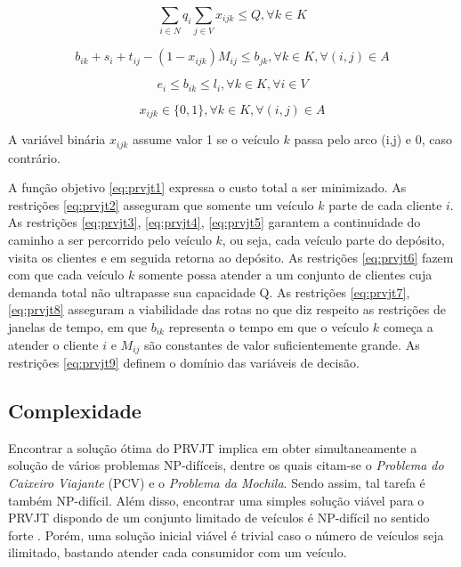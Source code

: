 \begin{equation} \label{eq:prvjt6}
\sum_{i \in N} q_i \sum_{j \in V} x_{ijk} \leq Q, \forall k \in K
\end{equation}

\begin{equation} \label{eq:prvjt7}
b_{ik} + s_i + t_{ij} -(1-x_{ijk})M_{ij} \leq b_{jk},\forall k \in K, \forall (i,j) \in A
\end{equation}

\begin{equation} \label{eq:prvjt8}
e_i \leq b_{ik} \leq l_i,\forall k \in K,\forall i \in V
\end{equation}

\begin{equation} \label{eq:prvjt9}
x_{ijk} \in \{0,1\},\forall k \in K,\forall (i,j) \in A
\end{equation}

A variável binária \(x_{ijk}\) assume valor 1 se o veículo \(k\) passa pelo arco (i,j) e 0, caso contrário.

A função objetivo \ref{eq:prvjt1} expressa o custo total a ser minimizado. 
As restrições \ref{eq:prvjt2} asseguram que somente um veículo \(k\) parte de cada cliente \(i\). 
As restrições \ref{eq:prvjt3}, \ref{eq:prvjt4}, \ref{eq:prvjt5} garantem a continuidade do caminho a ser percorrido pelo veículo \(k\), ou seja, cada veículo parte do depósito, visita os clientes e em seguida retorna ao depósito. 
As restrições \ref{eq:prvjt6} fazem com que cada veículo \(k\) somente possa atender a um conjunto de clientes cuja demanda total não ultrapasse sua capacidade Q. 
As restrições \ref{eq:prvjt7}, \ref{eq:prvjt8} asseguram a viabilidade das rotas no que diz respeito as restrições de janelas de tempo, em que \(b_{ik}\) representa o tempo em que o veículo \(k\) começa a atender o cliente \(i\) e \(M_{ij}\) são constantes de valor suficientemente grande.  As restrições \ref{eq:prvjt9} definem o domínio das variáveis de decisão.~\cite{CORDEAU}


\subsection{Complexidade}

Encontrar a solução ótima do PRVJT implica em obter simultaneamente a solução de vários problemas NP-difíceis, dentre os quais citam-se o \textit{Problema do Caixeiro Viajante} (PCV) e o \textit{Problema da Mochila}. Sendo assim, tal tarefa é também NP-difícil. Além disso, encontrar uma simples solução viável para o PRVJT dispondo de um conjunto limitado de veículos é NP-difícil no sentido forte \cite{Kohl}. Porém, uma solução inicial viável é trivial caso o número de veículos seja ilimitado, bastando atender cada consumidor com um veículo.

